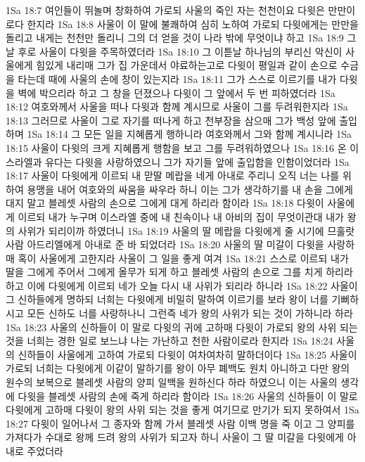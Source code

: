 1Sa 18:7  여인들이 뛰놀며 창화하여 가로되 사울의 죽인 자는 천천이요 다윗은 만만이로다 한지라
1Sa 18:8  사울이 이 말에 불쾌하여 심히 노하여 가로되 다윗에게는 만만을돌리고 내게는 천천만 돌리니 그의 더 얻을 것이 나라 밖에 무엇이냐 하고
1Sa 18:9  그 날 후로 사울이 다윗을 주목하였더라
1Sa 18:10  그 이튿날 하나님의 부리신 악신이 사울에게 힘있게 내리매 그가 집 가운데서 야료하는고로 다윗이 평일과 같이 손으로 수금을 타는데 때에 사울의 손에 창이 있는지라
1Sa 18:11  그가 스스로 이르기를 내가 다윗을 벽에 박으리라 하고 그 창을 던졌으나 다윗이 그 앞에서 두 번 피하였더라
1Sa 18:12  여호와께서 사울을 떠나 다윗과 함께 계시므로 사울이 그를 두려워한지라
1Sa 18:13  그러므로 사울이 그로 자기를 떠나게 하고 천부장을 삼으매 그가 백성 앞에 출입하며
1Sa 18:14  그 모든 일을 지혜롭게 행하니라 여호와께서 그와 함께 계시니라
1Sa 18:15  사울이 다윗의 크게 지혜롭게 행함을 보고 그를 두려워하였으나
1Sa 18:16  온 이스라엘과 유다는 다윗을 사랑하였으니 그가 자기들 앞에 출입함을 인함이었더라
1Sa 18:17  사울이 다윗에게 이르되 내 맏딸 메랍을 네게 아내로 주리니 오직 너는 나를 위하여 용맹을 내어 여호와의 싸움을 싸우라 하니 이는 그가 생각하기를 내 손을 그에게 대지 말고 블레셋 사람의 손으로 그에게 대게 하리라 함이라
1Sa 18:18  다윗이 사울에게 이르되 내가 누구며 이스라엘 중에 내 친속이나 내 아비의 집이 무엇이관대 내가 왕의 사위가 되리이까 하였더니
1Sa 18:19  사울의 딸 메랍을 다윗에게 줄 시기에 므훌랏 사람 아드리엘에게 아내로 준 바 되었더라
1Sa 18:20  사울의 딸 미갈이 다윗을 사랑하매 혹이 사울에게 고한지라 사울이 그 일을 좋게 여겨
1Sa 18:21  스스로 이르되 내가 딸을 그에게 주어서 그에게 올무가 되게 하고 블레셋 사람의 손으로 그를 치게 하리라 하고 이에 다윗에게 이르되 네가 오늘 다시 내 사위가 되리라 하니라
1Sa 18:22  사울이 그 신하들에게 명하되 너희는 다윗에게 비밀히 말하여 이르기를 보라 왕이 너를 기뻐하시고 모든 신하도 너를 사랑하나니 그런즉 네가 왕의 사위가 되는 것이 가하니라 하라
1Sa 18:23  사울의 신하들이 이 말로 다윗의 귀에 고하매 다윗이 가로되 왕의 사위 되는 것을 너희는 경한 일로 보느냐 나는 가난하고 천한 사람이로라 한지라
1Sa 18:24  사울의 신하들이 사울에게 고하여 가로되 다윗이 여차여차히 말하더이다
1Sa 18:25  사울이 가로되 너희는 다윗에게 이같이 말하기를 왕이 아무 폐백도 원치 아니하고 다만 왕의 원수의 보복으로 블레셋 사람의 양피 일백을 원하신다 하라 하였으니 이는 사울의 생각에 다윗을 블레셋 사람의 손에 죽게 하리라 함이라
1Sa 18:26  사울의 신하들이 이 말로 다윗에게 고하매 다윗이 왕의 사위 되는 것을 좋게 여기므로 만기가 되지 못하여서
1Sa 18:27  다윗이 일어나서 그 종자와 함께 가서 블레셋 사람 이백 명을 죽 이고 그 양피를 가져다가 수대로 왕께 드려 왕의 사위가 되고자 하니 사울이 그 딸 미갈을 다윗에게 아내로 주었더라

